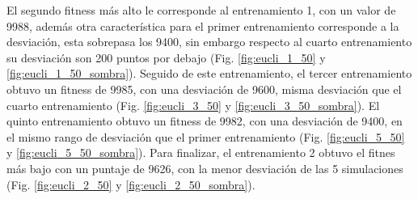 \documentclass[conference]{IEEEtran}
\begin{document}
El segundo fitness más alto le corresponde al entrenamiento 1, con un valor de 9988, además otra característica para el primer entrenamiento corresponde a la desviación, esta sobrepasa los 9400, sin embargo respecto al cuarto entrenamiento su desviación son 200 puntos por debajo (Fig. \ref{fig:eucli_1_50} y \ref{fig:eucli_1_50_sombra}). Seguido de este entrenamiento, el tercer entrenamiento obtuvo un fitness de 9985, con una desviación de 9600, misma desviación que el cuarto entrenamiento (Fig. \ref{fig:eucli_3_50} y \ref{fig:eucli_3_50_sombra}). El quinto entrenamiento obtuvo un fitness de 9982, con una desviación de 9400, en el mismo rango de desviación que el primer entrenamiento (Fig. \ref{fig:eucli_5_50} y \ref{fig:eucli_5_50_sombra}). Para finalizar, el entrenamiento 2 obtuvo el fitnes más bajo con un puntaje de 9626, con la menor desviación de las 5 simulaciones (Fig. \ref{fig:eucli_2_50} y \ref{fig:eucli_2_50_sombra}).

\end{document}
